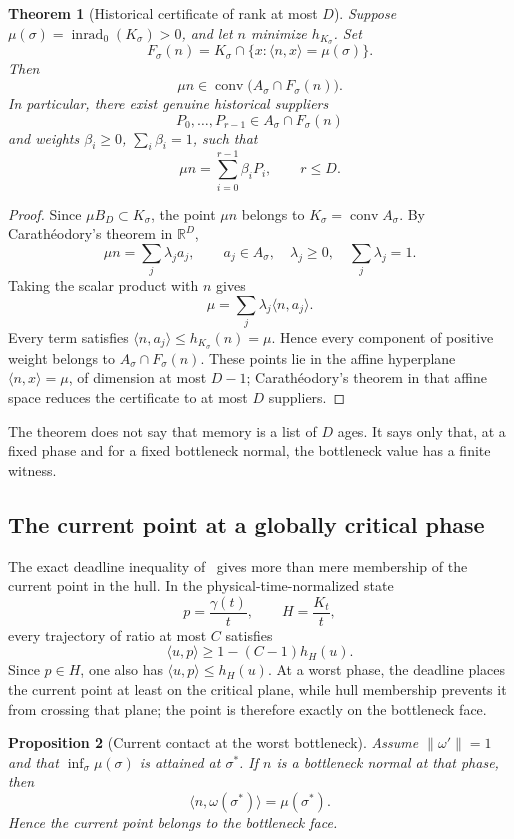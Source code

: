 \documentclass[10pt,a4paper]{article}
\newcommand{\R}{\mathbb{R}}
\newcommand{\conv}{\operatorname{conv}}
\newcommand{\inrad}{\operatorname{inrad}_{0}}
\newcommand{\BD}{B_D}
\theoremstyle{plain}
\newtheorem{theorem}{Theorem}[section]
\newtheorem{proposition}[theorem]{Proposition}
\theoremstyle{definition}
\theoremstyle{remark}
\begin{document}
\begin{theorem}[Historical certificate of rank at most $D$]
Suppose $\mu(\sigma)=\inrad(K_\sigma)>0$, and let $n$ minimize $h_{K_\sigma}$. Set
\[
  F_\sigma(n)=K_\sigma\cap\{x:\langle n,x\rangle=\mu(\sigma)\}.
\]
Then
\[
  \mu n\in\conv\bigl(A_\sigma\cap F_\sigma(n)\bigr).
\]
In particular, there exist genuine historical suppliers
\[
  P_0,\ldots,P_{r-1}\in A_\sigma\cap F_\sigma(n)
\]
and weights $\beta_i\ge0$, $\sum_i\beta_i=1$, such that
\[
  \mu n=\sum_{i=0}^{r-1}\beta_iP_i,
  \qquad r\le D.
\]
\end{theorem}

\begin{proof}
Since $\mu\BD\subset K_\sigma$, the point $\mu n$ belongs to $K_\sigma=\conv A_\sigma$. By Carathéodory's theorem in $\R^D$,
\[
  \mu n=\sum_j\lambda_j a_j,
  \qquad
  a_j\in A_\sigma,
  \quad \lambda_j\ge0,
  \quad \sum_j\lambda_j=1.
\]
Taking the scalar product with $n$ gives
\[
  \mu=\sum_j\lambda_j\langle n,a_j\rangle.
\]
Every term satisfies $\langle n,a_j\rangle\le h_{K_\sigma}(n)=\mu$. Hence every component of positive weight belongs to $A_\sigma\cap F_\sigma(n)$. These points lie in the affine hyperplane $\langle n,x\rangle=\mu$, of dimension at most $D-1$; Carathéodory's theorem in that affine space reduces the certificate to at most $D$ suppliers.
\end{proof}

The theorem does not say that memory is a list of $D$ ages. It says only that, at a fixed phase and for a fixed bottleneck normal, the bottleneck value has a finite witness.

\subsection{The current point at a globally critical phase}

The exact deadline inequality of~\cite[Proposition~12.5, equations~(12.11)--(12.12)]{koch-cell} gives more than mere membership of the current point in the hull. In the physical-time-normalized state
\[
  p=\frac{\gamma(t)}{t},
  \qquad
  H=\frac{K_t}{t},
\]
every trajectory of ratio at most $C$ satisfies
\[
  \langle u,p\rangle\ge1-(C-1)h_H(u).
\]
Since $p\in H$, one also has $\langle u,p\rangle\le h_H(u)$. At a worst phase, the deadline places the current point at least on the critical plane, while hull membership prevents it from crossing that plane; the point is therefore exactly on the bottleneck face.

\begin{proposition}[Current contact at the worst bottleneck]
Assume $\|\omega'\|=1$ and that $\inf_\sigma\mu(\sigma)$ is attained at $\sigma^*$. If $n$ is a bottleneck normal at that phase, then
\[
  \langle n,\omega(\sigma^*)\rangle=\mu(\sigma^*).
\]
Hence the current point belongs to the bottleneck face.
\end{proposition}
\end{document}
